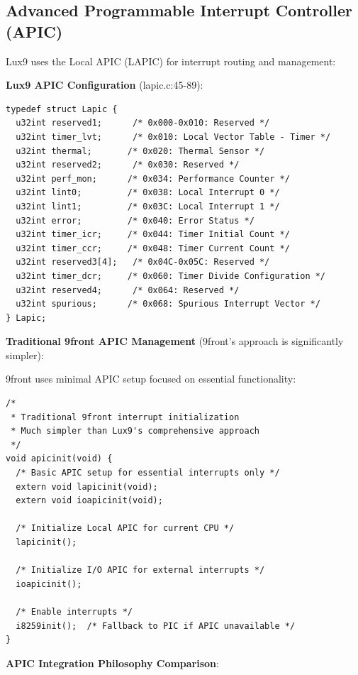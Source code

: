 \documentclass[11pt,letterpaper]{article}
\begin{document}
\subsection{Advanced Programmable Interrupt Controller (APIC)}

Lux9 uses the Local APIC (LAPIC) for interrupt routing and management:

\textbf{Lux9 APIC Configuration} (lapic.c:45-89):

\begin{lstlisting}
typedef struct Lapic {
  u32int reserved1;      /* 0x000-0x010: Reserved */
  u32int timer_lvt;      /* 0x010: Local Vector Table - Timer */
  u32int thermal;       /* 0x020: Thermal Sensor */
  u32int reserved2;      /* 0x030: Reserved */
  u32int perf_mon;      /* 0x034: Performance Counter */
  u32int lint0;         /* 0x038: Local Interrupt 0 */
  u32int lint1;         /* 0x03C: Local Interrupt 1 */
  u32int error;         /* 0x040: Error Status */
  u32int timer_icr;     /* 0x044: Timer Initial Count */
  u32int timer_ccr;     /* 0x048: Timer Current Count */
  u32int reserved3[4];   /* 0x04C-0x05C: Reserved */
  u32int timer_dcr;     /* 0x060: Timer Divide Configuration */
  u32int reserved4;      /* 0x064: Reserved */
  u32int spurious;      /* 0x068: Spurious Interrupt Vector */
} Lapic;
\end{lstlisting}

\textbf{Traditional 9front APIC Management} (9front's approach is significantly simpler):

9front uses minimal APIC setup focused on essential functionality:

\begin{lstlisting}
/*
 * Traditional 9front interrupt initialization
 * Much simpler than Lux9's comprehensive approach
 */
void apicinit(void) {
  /* Basic APIC setup for essential interrupts only */
  extern void lapicinit(void);
  extern void ioapicinit(void);
  
  /* Initialize Local APIC for current CPU */
  lapicinit();
  
  /* Initialize I/O APIC for external interrupts */
  ioapicinit();
  
  /* Enable interrupts */
  i8259init();  /* Fallback to PIC if APIC unavailable */
}
\end{lstlisting}

\textbf{APIC Integration Philosophy Comparison}:
\end{document}
